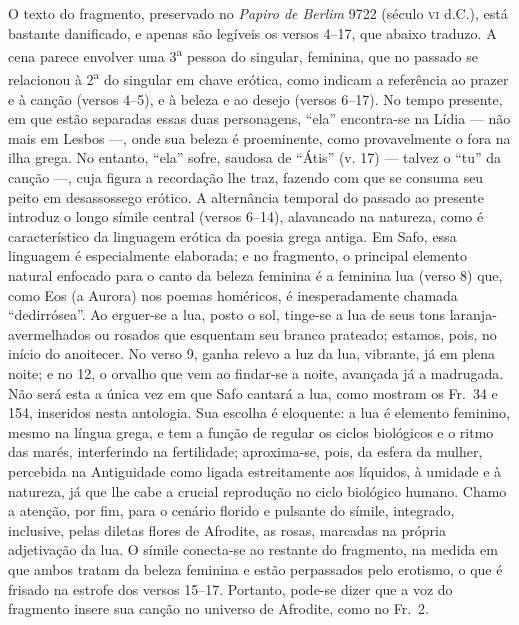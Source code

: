 {\small O texto do fragmento, preservado no \textit{Papiro de Berlim} 9722 (século \textsc{vi}
d.C.), está bastante danificado, e apenas são legíveis os versos 4--17, que
abaixo traduzo. A cena parece envolver uma 3\textsuperscript{a} pessoa do
singular, feminina, que no passado se relacionou à 2\textsuperscript{a} do
singular em chave erótica, como indicam a referência ao prazer e à canção		
(versos 4--5), e à beleza e ao desejo (versos 6--17). No tempo presente, 
em que estão separadas essas duas personagens, ``ela” encontra-se na Lídia --- não
mais em Lesbos ---, onde sua beleza é proeminente, como provavelmente o fora na
ilha grega. No entanto, ``ela” sofre, saudosa de ``Átis” (v.
17) --- talvez o ``tu” da canção ---, cuja figura a recordação lhe traz, fazendo
com que se consuma seu peito em desassossego erótico. A alternância temporal do
passado ao presente introduz o longo símile central (versos 6--14), alavancado
na natureza, como é característico da linguagem erótica da poesia grega antiga.
Em Safo, essa linguagem é especialmente elaborada; e no fragmento, o principal
elemento natural enfocado para o canto da beleza feminina é a feminina lua
(verso 8) que, como Eos (a Aurora) nos poemas homéricos, é inesperadamente
chamada ``dedirrósea”. Ao erguer-se a lua, posto o sol, tinge-se a lua
de seus tons laranja-avermelhados ou rosados que esquentam seu branco prateado;
estamos, pois, no início do anoitecer. No verso 9, ganha relevo a luz da lua,
vibrante, já em plena noite; e no 12, o orvalho que vem ao findar-se a noite,
avançada já a madrugada. Não será esta a única vez em que Safo cantará a lua,
como mostram os Fr.~34 e 154, inseridos nesta antologia. Sua escolha é
eloquente: a lua é elemento feminino, mesmo na língua grega, e tem a função de
regular os ciclos biológicos e o ritmo das marés, interferindo na fertilidade;
aproxima-se, pois, da esfera da mulher, percebida na Antiguidade como ligada
estreitamente aos líquidos, à umidade e à natureza, já que lhe cabe a crucial
reprodução no ciclo biológico humano. Chamo a atenção, por fim, para o cenário
florido e pulsante do símile, integrado, inclusive, pelas diletas flores de
Afrodite, as rosas, marcadas na própria adjetivação da lua. O símile conecta-se
ao restante do fragmento, na medida em que ambos tratam da beleza feminina e
estão perpassados pelo erotismo, o que é frisado na estrofe dos versos 15--17.
Portanto, pode-se dizer que a voz do fragmento insere sua canção no universo de
Afrodite, como no Fr.~2. }

